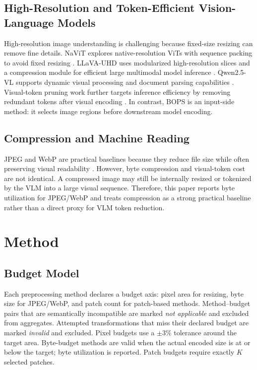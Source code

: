 \documentclass[conference]{IEEEtran}
\newcommand{\method}{BOPS}
\begin{document}
\subsection{High-Resolution and Token-Efficient Vision-Language Models}
High-resolution image understanding is challenging because fixed-size resizing can remove fine details. NaViT explores native-resolution ViTs with sequence packing to avoid fixed resizing \cite{navit}. LLaVA-UHD uses modularized high-resolution slices and a compression module for efficient large multimodal model inference \cite{llavauhd}. Qwen2.5-VL supports dynamic visual processing and document parsing capabilities \cite{qwen25vl}. Visual-token pruning work further targets inference efficiency by removing redundant tokens after visual encoding \cite{adaptiveprune,divprune}. In contrast, \method{} is an input-side method: it selects image regions before downstream model encoding.

\subsection{Compression and Machine Reading}
JPEG and WebP are practical baselines because they reduce file size while often preserving visual readability \cite{jpeg,webp}. However, byte compression and visual-token cost are not identical. A compressed image may still be internally resized or tokenized by the VLM into a large visual sequence. Therefore, this paper reports byte utilization for JPEG/WebP and treats compression as a strong practical baseline rather than a direct proxy for VLM token reduction.

\section{Method}
\subsection{Budget Model}
Each preprocessing method declares a budget axis: pixel area for resizing, byte size for JPEG/WebP, and patch count for patch-based methods. Method--budget pairs that are semantically incompatible are marked \emph{not applicable} and excluded from aggregates. Attempted transformations that miss their declared budget are marked \emph{invalid} and excluded. Pixel budgets use a $\pm3\%$ tolerance around the target area. Byte-budget methods are valid when the actual encoded size is at or below the target; byte utilization is reported. Patch budgets require exactly $K$ selected patches.
\end{document}
